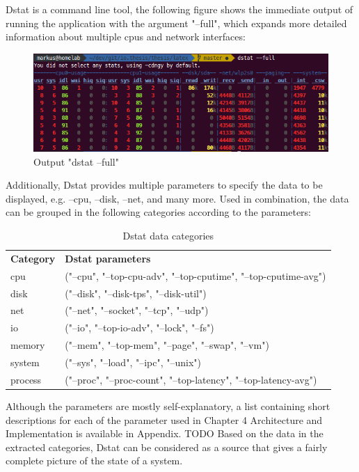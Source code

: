 Dstat is a command line tool, the following figure shows the immediate output of running
the application with the argument "--full", which expands more detailed information about
multiple cpus and network interfaces:

\begin{figure}[H]
	\centering
	\includegraphics[width=1.0\textwidth]{../images/06-dstat-full.png}
	\caption{Output "dstat --full"}
	\label{dstat-output}
\end{figure}

Additionally, Dstat provides multiple parameters to specify the data to be displayed, e.g.
--cpu, --disk, --net, and many more. Used in combination, the data can be grouped in the
following categories according to the parameters:

\begin{table}[H]
    \begin{tabular}{ll}
        \textbf{Category} & \textbf{Dstat parameters} \\
        cpu & ("--cpu", "--top-cpu-adv", "--top-cputime", "--top-cputime-avg")\\
        disk & ("--disk", "--disk-tps", "--disk-util")\\
        net & ("--net", "--socket", "--tcp", "--udp")\\
        io & ("--io", "--top-io-adv", "--lock", "--fs")\\
        memory & ("--mem", "--top-mem", "--page", "--swap", "--vm")\\
        system & ("--sys", "--load", "--ipc", "--unix")\\
        process & ("--proc", "--proc-count", "--top-latency", "--top-latency-avg")\\
    \end{tabular}
    \caption{Dstat data categories}
    \label{tbl:dstatcategories}
\end{table}

Although the parameters are mostly self-explanatory, a list containing short descriptions
for each of the parameter used in Chapter 4 Architecture and Implementation is available in
Appendix. TODO Based on the data in the extracted categories, Dstat can be considered
as a source that gives a fairly complete picture of the state of a system.

